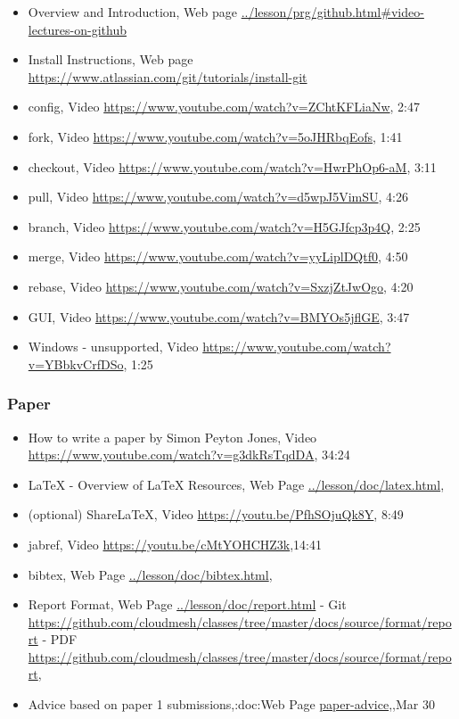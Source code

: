 \documentclass{article}
\begin{document}
\begin{itemize}
\item Overview and Introduction, Web page \url{../lesson/prg/github.html#video-lectures-on-github}
\item Install Instructions, Web page  \url{https://www.atlassian.com/git/tutorials/install-git}
 
\item config, Video \url{https://www.youtube.com/watch?v=ZChtKFLiaNw}, 2:47
\item fork, Video \url{https://www.youtube.com/watch?v=5oJHRbqEofs}, 1:41
\item checkout, Video \url{https://www.youtube.com/watch?v=HwrPhOp6-aM}, 3:11
\item pull, Video \url{https://www.youtube.com/watch?v=d5wpJ5VimSU}, 4:26
\item branch, Video \url{https://www.youtube.com/watch?v=H5GJfcp3p4Q}, 2:25
\item merge, Video \url{https://www.youtube.com/watch?v=yyLiplDQtf0}, 4:50
\item rebase, Video \url{https://www.youtube.com/watch?v=SxzjZtJwOgo}, 4:20
\item GUI, Video \url{https://www.youtube.com/watch?v=BMYOs5jflGE}, 3:47
\item Windows - unsupported, Video \url{https://www.youtube.com/watch?v=YBbkvCrfDSo}, 1:25
\end{itemize}

\subsubsection{Paper}


\begin{itemize}
\item How to write a paper by Simon Peyton Jones, Video \url{https://www.youtube.com/watch?v=g3dkRsTqdDA}, 34:24
\item LaTeX - Overview of LaTeX Resources, Web Page \url{../lesson/doc/latex.html},
\item (optional) ShareLaTeX, Video \url{https://youtu.be/PfhSOjuQk8Y}, 8:49
\item jabref, Video \url{https://youtu.be/cMtYOHCHZ3k},14:41
\item bibtex, Web Page \url{../lesson/doc/bibtex.html},
\item Report Format, Web Page \url{../lesson/doc/report.html} - Git \url{https://github.com/cloudmesh/classes/tree/master/docs/source/format/report} - PDF \url{https://github.com/cloudmesh/classes/tree/master/docs/source/format/report},
\item Advice based on paper 1 submissions,:doc:Web Page \url{paper-advice},,Mar 30
\end{itemize}
\end{document}
